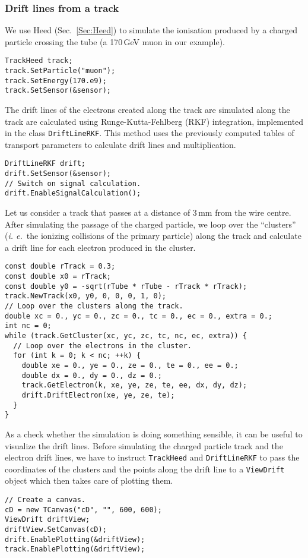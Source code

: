 \subsubsection{Drift lines from a track}
We use Heed (Sec.~\ref{Sec:Heed}) to simulate the ionisation 
produced by a charged particle crossing the tube 
(a 170\,GeV muon in our example).
\begin{lstlisting}
TrackHeed track;
track.SetParticle("muon");
track.SetEnergy(170.e9);
track.SetSensor(&sensor);
\end{lstlisting}
The drift lines of the electrons created along the track are simulated 
along the track are calculated using Runge-Kutta-Fehlberg (RKF) integration,
implemented in the class \texttt{DriftLineRKF}.
This method uses the previously computed tables of transport parameters to 
calculate drift lines and multiplication. 
\begin{lstlisting}
DriftLineRKF drift;
drift.SetSensor(&sensor);
// Switch on signal calculation.
drift.EnableSignalCalculation();
\end{lstlisting}
Let us consider a track that passes at a distance of 3\,mm
from the wire centre. After simulating the passage of the charged particle,
we loop over the ``clusters'' 
(\textit{i. e.}~the ionizing collisions of the primary particle)
along the track and calculate a drift line for each electron produced in 
the cluster.
\begin{lstlisting}
const double rTrack = 0.3;
const double x0 = rTrack;
const double y0 = -sqrt(rTube * rTube - rTrack * rTrack);
track.NewTrack(x0, y0, 0, 0, 0, 1, 0);
// Loop over the clusters along the track.
double xc = 0., yc = 0., zc = 0., tc = 0., ec = 0., extra = 0.;
int nc = 0;
while (track.GetCluster(xc, yc, zc, tc, nc, ec, extra)) {
  // Loop over the electrons in the cluster.
  for (int k = 0; k < nc; ++k) {
    double xe = 0., ye = 0., ze = 0., te = 0., ee = 0.;
    double dx = 0., dy = 0., dz = 0.;
    track.GetElectron(k, xe, ye, ze, te, ee, dx, dy, dz);
    drift.DriftElectron(xe, ye, ze, te);
  }
}
\end{lstlisting}
As a check whether the simulation is doing something sensible, 
it can be useful to visualize the drift lines. 
Before simulating the charged particle track and
the electron drift lines, we have to instruct \texttt{TrackHeed} and
\texttt{DriftLineRKF} to pass the coordinates of the clusters and the 
points along the drift line to a \texttt{ViewDrift} object
which then takes care of plotting them.
\begin{lstlisting}
// Create a canvas.
cD = new TCanvas("cD", "", 600, 600);
ViewDrift driftView;
driftView.SetCanvas(cD);
drift.EnablePlotting(&driftView);
track.EnablePlotting(&driftView);
\end{lstlisting}
